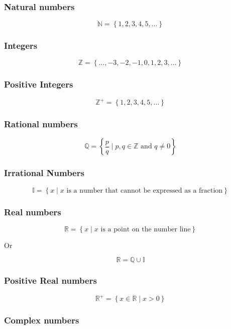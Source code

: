 \documentclass[12pt letter]{report}
\begin{document}
\subsubsection{Natural numbers}

\[
  \mathbb{N} = \left\{ 1, 2, 3, 4, 5, \ldots \right\}
\]

\subsubsection{Integers}

\[
  \mathbb{Z} = \left\{ \ldots, -3, -2, -1, 0, 1, 2, 3, \ldots \right\}
\]

\subsubsection{Positive Integers}

\[
  \mathbb{Z}^{+} = \left\{ 1, 2, 3, 4, 5, \ldots \right\}
\]

\subsubsection{Rational numbers}

\[
  \mathbb{Q} = \left\{ \frac{p}{q} \mid p, q \in \mathbb{Z} \text{ and } q \neq 0 \right\}
\]

\subsubsection{Irrational Numbers}
\[
  \mathbb{I} = \left\{ x \mid x \text{ is a number that cannot be expressed as a fraction} \right\}
\]

\subsubsection{Real numbers}

\[
  \mathbb{R} = \left\{ x \mid x \text{ is a point on the number line} \right\}
\]

Or

\[
  \mathbb{R} = \mathbb{Q} \cup \mathbb{I}
\]

\subsubsection{Positive Real numbers}
\[
  \mathbb{R}^{+} = \left\{ x \in \mathbb{R} \mid x > 0 \right\}
\]

\subsubsection{Complex numbers}
\end{document}
